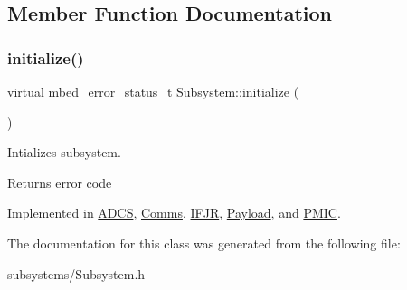 \subsection{Member Function Documentation}
\mbox{\label{class_subsystem_afa43e7c1c8b49e514b944f517d4dc905}} 
\subsubsection{\texorpdfstring{initialize()}{initialize()}}
{\footnotesize\ttfamily virtual mbed\+\_\+error\+\_\+status\+\_\+t Subsystem\+::initialize (\begin{DoxyParamCaption}{ }\end{DoxyParamCaption})\hspace{0.3cm}{\ttfamily [pure virtual]}}



Intializes subsystem. 

\begin{DoxyReturn}{Returns}
error code 
\end{DoxyReturn}


Implemented in \mbox{\hyperlink{class_a_d_c_s_a5a4196a5298a2e804ee85f2965b31133}{A\+D\+CS}}, \mbox{\hyperlink{class_comms_adf638922e6c53bef0fab4f482775f072}{Comms}}, \mbox{\hyperlink{class_i_f_j_r_a0a7d913d00e8573b613b980f17ed2fd4}{I\+F\+JR}}, \mbox{\hyperlink{class_payload_aa55a2da734e6950391d73b0837bbd3b9}{Payload}}, and \mbox{\hyperlink{class_p_m_i_c_ae899cdd3d66ecef345c748f9c42b5399}{P\+M\+IC}}.



The documentation for this class was generated from the following file\+:\begin{DoxyCompactItemize}
\item 
subsystems/Subsystem.\+h\end{DoxyCompactItemize}
